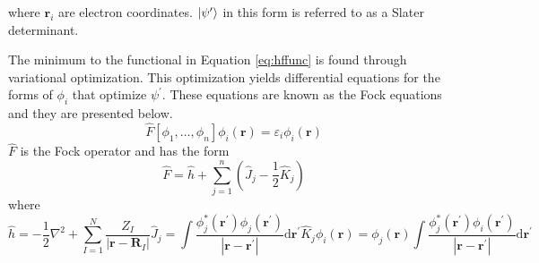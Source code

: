 \documentclass[final,3p,times,twocolumn]{elsarticle}
\begin{document}
where $\mathbf r_i$ are electron coordinates. $\ket{\psi^\prime}$ in this form is referred to as a Slater determinant.\cite{slater} %

The minimum to the functional in Equation \eqref{eq:hffunc} is found through variational optimization.\cite{fock} This optimization yields differential equations for the forms of $\phi_i$ that optimize $\psi^\prime$. These equations are known as the Fock equations and they are presented below. %
\begin{equation} \label{eq:fockeq}
\hat F[\phi_1, \ldots, \phi_n] \phi_i(\mathbf{r}) = \varepsilon_i \phi_i(\mathbf{r})
\end{equation}
$\hat F$ is the Fock operator and has the form
\begin{equation} \label{eq:fockoperator}
\hat F = \hat h  + \sum_{j=1}^n \left( \hat J_j - \frac{1}{2}\hat K_j \right)
\end{equation}
where
\begin{subequations}
\begin{equation} \label{eq:fockcore}
\hat h = -\frac{1}{2}\nabla^2 + \sum_{I = 1}^N \frac{Z_I}{|\mathbf{r} - \mathbf{R}_I|} 
\end{equation}
\begin{equation} \label{eq:fockcoloumb}
\hat J_j = \int \frac{\phi_j^*(\mathbf{r}^\prime)\phi_j(\mathbf{r}^\prime)}{|\mathbf{r}-\mathbf{r}^\prime|} \mathrm{d}\mathbf{r}^\prime
\end{equation}
\begin{equation} \label{eq:fockexchange}
\hat K_j \phi_i(\mathbf{r}) = \phi_j(\mathbf{r})\int \frac{\phi_j^*(\mathbf{r}^\prime)\phi_i(\mathbf{r}^\prime)}{|\mathbf{r}-\mathbf{r^\prime}|} \mathrm{d}\mathbf{r}^\prime
\end{equation}
\end{subequations}
\end{document}

